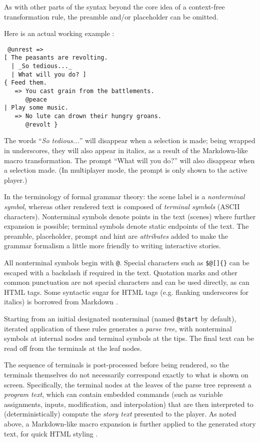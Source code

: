 \documentclass{acm_proc_article-sp}
\begin{document}
As with other parts of the syntax beyond the core idea of a context-free transformation rule,
the preamble and/or placeholder can be omitted.

Here is an actual working example \cite{ChoiceOfGamesBlog}:
\begin{verbatim}
 @unrest =>
[ The peasants are revolting. 
  | _So tedious..._ 
  | What will you do? ] 
{ Feed them.
   => You cast grain from the battlements.
      @peace
| Play some music.
   => No lute can drown their hungry groans.
      @revolt }
\end{verbatim}

The words ``{\em So tedious...}'' will disappear when a selection is made; being wrapped in underscores, they will also appear in italics, as a result of the Markdown-like macro transformation.
The prompt ``What will you do?'' will also disappear when a selection made.
(In multiplayer mode, the prompt is only shown to the active player.)



In the terminology of formal grammar theory: the scene label {\tt \@scene} is a {\em nonterminal symbol},
whereas other rendered text is composed of {\em terminal symbols} (ASCII characters).
Nonterminal symbols denote points in the text (scenes) where further expansion is possible;
terminal symbols denote static endpoints of the text.
The preamble, placeholder, prompt and hint are {\em attributes}
added to make the grammar formalism a little more friendly to writing interactive stories.

All nonterminal symbols begin with {\tt @}.
Special characters such as {\tt \$@[]\{\}} can be escaped with a backslash if required in the text.
Quotation marks and other common punctuation are not special characters and can be used directly, as can HTML tags.
Some syntactic sugar for HTML tags (e.g. flanking underscores for italics) is borrowed from Markdown \cite{Markdown}.

Starting from an initial designated nonterminal (named {\tt @start} by default),
iterated application of these rules generates a {\em parse tree},
with nonterminal symbols at internal nodes and terminal symbols at the tips.
The final text can be read off from the terminals at the leaf nodes.

The sequence of terminals is post-processed before being rendered,
so the terminals themselves do not necessarily correspond exactly to what is shown on screen.
Specifically, the terminal nodes at the leaves of the parse tree represent a {\em program text},
which can contain embedded commands (such as variable assignments, inputs, modification, and interpolation)
that are then interpreted to (deterministically) compute the {\em story text} presented to the player.
As noted above, a Markdown-like macro expansion is further applied to the generated story text,
for quick HTML styling \cite{Markdown}.
\end{document}
